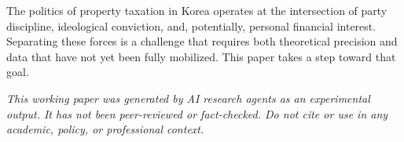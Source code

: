 \documentclass[11pt]{article}
\begin{document}
The politics of property taxation in Korea operates at the intersection of party discipline, ideological conviction, and, potentially, personal financial interest. Separating these forces is a challenge that requires both theoretical precision and data that have not yet been fully mobilized. This paper takes a step toward that goal.

\bigskip
\noindent\textit{This working paper was generated by AI research agents as an
experimental output. It has not been peer-reviewed or fact-checked.
Do not cite or use in any academic, policy, or professional context.}



\end{document}
